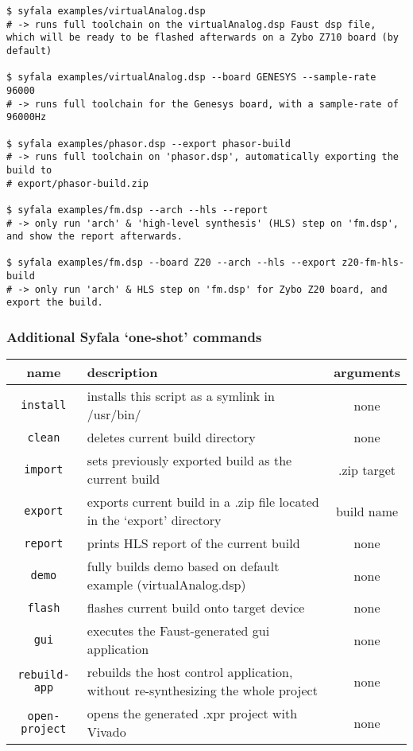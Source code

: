 \begin{lstlisting}
$ syfala examples/virtualAnalog.dsp
# -> runs full toolchain on the virtualAnalog.dsp Faust dsp file, which will be ready to be flashed afterwards on a Zybo Z710 board (by default)

$ syfala examples/virtualAnalog.dsp --board GENESYS --sample-rate 96000
# -> runs full toolchain for the Genesys board, with a sample-rate of 96000Hz

$ syfala examples/phasor.dsp --export phasor-build
# -> runs full toolchain on 'phasor.dsp', automatically exporting the build to 
# export/phasor-build.zip

$ syfala examples/fm.dsp --arch --hls --report
# -> only run 'arch' & 'high-level synthesis' (HLS) step on 'fm.dsp', and show the report afterwards.

$ syfala examples/fm.dsp --board Z20 --arch --hls --export z20-fm-hls-build
# -> only run 'arch' & HLS step on 'fm.dsp' for Zybo Z20 board, and export the build.
\end{lstlisting}

\subsubsection{Additional Syfala `one-shot' commands}

\begin{tabular}{|c|p{9cm}|c|}
  \toprule
  name & description & arguments \\
\midrule
\texttt{install} & installs this script as a symlink in /usr/bin/ &
none \\
\texttt{clean} & deletes current build directory & none \\
\texttt{import} & sets previously exported build as the
current build & .zip target\\
\texttt{export} & exports current build in a .zip file located in the
`export' directory & build name\\
\texttt{report} & prints HLS report of the current build & none \\
\texttt{demo} & fully builds demo based on default example
(virtualAnalog.dsp) & none \\
\texttt{flash} & flashes current build onto target device & none \\
\texttt{gui} & executes the Faust-generated gui application & none \\
\texttt{rebuild-app} & rebuilds the host control application, without
re-synthesizing the whole project & none \\
\texttt{open-project} & opens the generated .xpr project
with Vivado & none \\

\bottomrule
\end{tabular}

